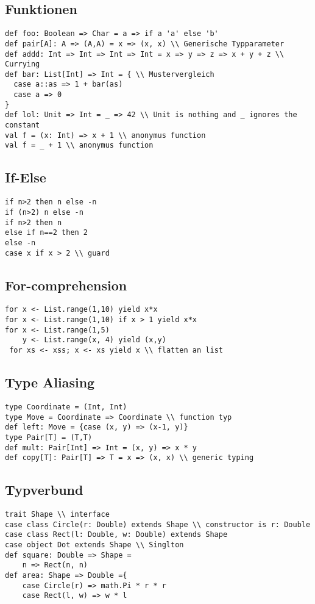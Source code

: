 \subsection{Funktionen}
\begin{verbatim}
def foo: Boolean => Char = a => if a 'a' else 'b'
def pair[A]: A => (A,A) = x => (x, x) \\ Generische Typparameter
def addd: Int => Int => Int => Int = x => y => z => x + y + z \\ Currying
def bar: List[Int] => Int = { \\ Mustervergleich
  case a::as => 1 + bar(as)
  case a => 0
}
def lol: Unit => Int = _ => 42 \\ Unit is nothing and _ ignores the constant
val f = (x: Int) => x + 1 \\ anonymus function
val f = _ + 1 \\ anonymus function
\end{verbatim}
\subsection{If-Else}
\begin{verbatim}
if n>2 then n else -n
if (n>2) n else -n
if n>2 then n
else if n==2 then 2
else -n
case x if x > 2 \\ guard
\end{verbatim}
\subsection{For-comprehension}
\begin{verbatim}
for x <- List.range(1,10) yield x*x
for x <- List.range(1,10) if x > 1 yield x*x
for x <- List.range(1,5)
    y <- List.range(x, 4) yield (x,y)
 for xs <- xss; x <- xs yield x \\ flatten an list
\end{verbatim}
\subsection{Type Aliasing}
\begin{verbatim}
type Coordinate = (Int, Int)
type Move = Coordinate => Coordinate \\ function typ
def left: Move = {case (x, y) => (x-1, y)}
type Pair[T] = (T,T)
def mult: Pair[Int] => Int = (x, y) => x * y
def copy[T]: Pair[T] => T = x => (x, x) \\ generic typing
\end{verbatim}
\subsection{Typverbund}
\begin{verbatim}
trait Shape \\ interface
case class Circle(r: Double) extends Shape \\ constructor is r: Double
case class Rect(l: Double, w: Double) extends Shape
case object Dot extends Shape \\ Singlton
def square: Double => Shape =
    n => Rect(n, n)
def area: Shape => Double ={
    case Circle(r) => math.Pi * r * r
    case Rect(l, w) => w * l
\end{verbatim}
